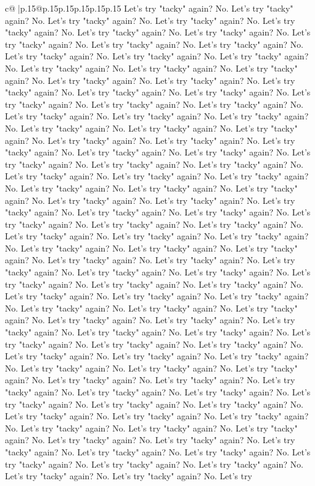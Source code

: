 \documentclass{article}
\begin{document}
{\begin{supertabular}{c@{$\;$}|p{.15\linewidth}@{}p{.15\linewidth}p{.15\linewidth}p{.15\linewidth}p{.15\linewidth}p{.15\linewidth}}
{{{Let's try "tacky" again? No. Let's try "tacky" again? No. Let's try "tacky" again? No. Let's try "tacky" again? No. Let's try "tacky" again? No. Let's try "tacky" again? No. Let's try "tacky" again? No. Let's try "tacky" again? No. Let's try "tacky" again? No. Let's try "tacky" again? No. Let's try "tacky" again? No. Let's try "tacky" again? No. Let's try "tacky" again? No. Let's try "tacky" again? No. Let's try "tacky" again? No. Let's try "tacky" again? No. Let's try "tacky" again? No. Let's try "tacky" again? No. Let's try "tacky" again? No. Let's try "tacky" again? No. Let's try "tacky" again? No. Let's try "tacky" again? No. Let's try "tacky" again? No. Let's try "tacky" again? No. Let's try "tacky" again? No. Let's try "tacky" again? No. Let's try "tacky" again? No. Let's try "tacky" again? No. Let's try "tacky" again? No. Let's try "tacky" again? No. Let's try "tacky" again? No. Let's try "tacky" again? No. Let's try "tacky" again? No. Let's try "tacky" again? No. Let's try "tacky" again? No. Let's try "tacky" again? No. Let's try "tacky" again? No. Let's try "tacky" again? No. Let's try "tacky" again? No. Let's try "tacky" again? No. Let's try "tacky" again? No. Let's try "tacky" again? No. Let's try "tacky" again? No. Let's try "tacky" again? No. Let's try "tacky" again? No. Let's try "tacky" again? No. Let's try "tacky" again? No. Let's try "tacky" again? No. Let's try "tacky" again? No. Let's try "tacky" again? No. Let's try "tacky" again? No. Let's try "tacky" again? No. Let's try "tacky" again? No. Let's try "tacky" again? No. Let's try "tacky" again? No. Let's try "tacky" again? No. Let's try "tacky" again? No. Let's try "tacky" again? No. Let's try "tacky" again? No. Let's try "tacky" again? No. Let's try "tacky" again? No. Let's try "tacky" again? No. Let's try "tacky" again? No. Let's try "tacky" again? No. Let's try "tacky" again? No. Let's try "tacky" again? No. Let's try "tacky" again? No. Let's try "tacky" again? No. Let's try "tacky" again? No. Let's try "tacky" again? No. Let's try "tacky" again? No. Let's try "tacky" again? No. Let's try "tacky" again? No. Let's try "tacky" again? No. Let's try "tacky" again? No. Let's try "tacky" again? No. Let's try "tacky" again? No. Let's try "tacky" again? No. Let's try "tacky" again? No. Let's try "tacky" again? No. Let's try "tacky" again? No. Let's try "tacky" again? No. Let's try "tacky" again? No. Let's try "tacky" again? No. Let's try "tacky" again? No. Let's try "tacky" again? No. Let's try "tacky" again? No. Let's try "tacky" again? No. Let's try "tacky" again? No. Let's try "tacky" again? No. Let's try "tacky" again? No. Let's try "tacky" again? No. Let's try "tacky" again? No. Let's try "tacky" again? No. Let's try "tacky" again? No. Let's try "tacky" again? No. Let's try "tacky" again? No. Let's try "tacky" again? No. Let's try "tacky" again? No. Let's try "tacky" again? No. Let's try "tacky" again? No. Let's try "tacky" again? No. Let's try "tacky" again? No. Let's try "tacky" again? No. Let's try "tacky" again? No. Let's try "tacky" again? No. Let's try "tacky" again? No. Let's try "tacky" again? No. Let's try "tacky" again? No. Let's try "tacky" again? No. Let's try }}}
\end{supertabular}}
\end{document}
